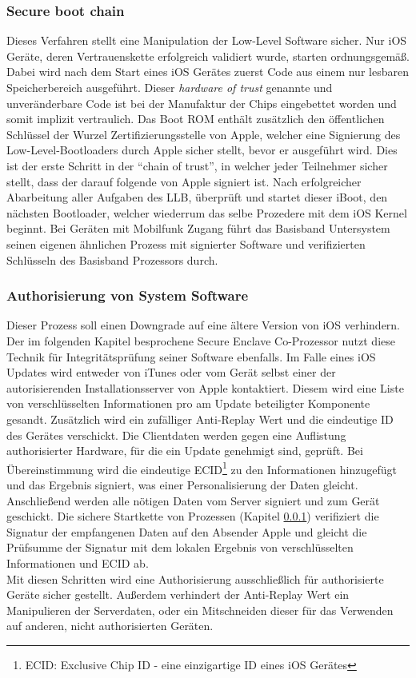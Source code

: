 	\subsubsection{Secure boot chain}\label{sec:secure-boot-chain}
		Dieses Verfahren stellt eine Manipulation der Low-Level Software sicher. Nur
		iOS Geräte, deren Vertrauenskette erfolgreich validiert wurde, starten
		ordnungsgemäß. Dabei wird nach dem Start eines iOS Gerätes zuerst Code aus
		einem nur lesbaren Speicherbereich ausgeführt. Dieser \textit{hardware of
		trust} genannte und unveränderbare Code ist bei der Manufaktur der Chips
		eingebettet worden und somit implizit vertraulich. Das Boot ROM enthält
		zusätzlich den öffentlichen Schlüssel der Wurzel Zertifizierungsstelle von
		Apple, welcher eine Signierung des Low-Level-Bootloaders durch Apple sicher
		stellt, bevor er ausgeführt wird.
		Dies ist der erste Schritt in der "`chain of trust"', in welcher jeder
		Teilnehmer sicher stellt, dass der darauf folgende von Apple signiert ist. 		
		Nach erfolgreicher Abarbeitung aller Aufgaben des LLB, überprüft und startet
		dieser iBoot, den nächsten Bootloader, welcher wiederrum das selbe Prozedere
		mit dem iOS Kernel beginnt. Bei Geräten mit Mobilfunk Zugang führt das
		Basisband Untersystem seinen eigenen ähnlichen Prozess mit signierter 
		Software und verifizierten Schlüsseln des Basisband Prozessors durch.
		
	\subsubsection{Authorisierung von System Software}\label{sec:code-signing}
		Dieser Prozess soll einen Downgrade auf eine ältere Version von iOS
		verhindern. Der im folgenden Kapitel besprochene Secure Enclave Co-Prozessor
		nutzt diese Technik für Integritätsprüfung seiner Software ebenfalls. Im Falle
		eines iOS Updates wird entweder von iTunes oder vom Gerät selbst einer der
		autorisierenden Installationsserver von Apple kontaktiert. Diesem
		wird eine Liste von verschlüsselten Informationen pro am Update beteiligter
		Komponente gesandt. Zusätzlich wird ein zufälliger
		Anti-Replay Wert und die eindeutige ID des Gerätes
		verschickt. Die Clientdaten werden gegen eine Auflistung authorisierter Hardware, für die ein
		Update genehmigt sind, geprüft. Bei Übereinstimmung wird die eindeutige
		ECID\footnote{ECID: Exclusive Chip ID - eine einzigartige ID eines iOS
		Gerätes} zu den Informationen hinzugefügt und das Ergebnis signiert, was einer Personalisierung der Daten gleicht.
		Anschließend werden alle nötigen Daten vom Server signiert und zum Gerät
		geschickt. Die sichere Startkette von Prozessen (Kapitel
		\ref{sec:secure-boot-chain}) verifiziert die Signatur der empfangenen Daten
		auf den Absender Apple und gleicht die Prüfsumme der Signatur mit dem lokalen
		Ergebnis von verschlüsselten Informationen und ECID ab.\\
		Mit diesen Schritten wird eine Authorisierung ausschließlich für authorisierte
		Geräte sicher gestellt. Außerdem verhindert der Anti-Replay Wert ein
		Manipulieren der Serverdaten, oder ein Mitschneiden dieser für
		das Verwenden auf anderen, nicht authorisierten Geräten.

